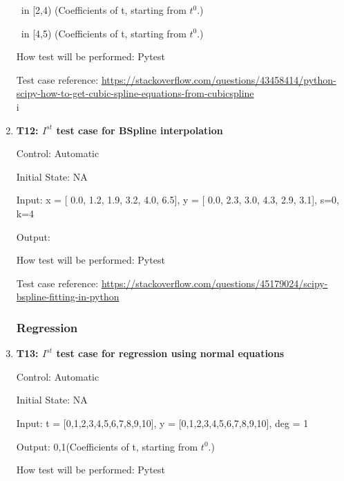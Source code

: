 \documentclass[12pt, titlepage]{article}
\begin{document}
\begin{enumerate}
~\newline [4.0, 4.0, 1.0, 1.0] in [2,4) (Coefficients of t, starting from $t^{0}$.)

~\newline[3.0, 3.61111111, 4.0, 4.0] in [4,5) (Coefficients of t, starting from $t^{0}$.)

How test will be performed: Pytest

Test case reference: \url{https://stackoverflow.com/questions/43458414/python-scipy-how-to-get-cubic-spline-equations-from-cubicspline}\\
i 

\item{\textbf{T12: $I^{st}$ test case for BSpline interpolation} \\}

Control: Automatic 

Initial State: NA

Input: x = [ 0.0, 1.2,  1.9,  3.2,  4.0,  6.5], y = [ 0.0,  2.3,  3.0,  4.3,  2.9,  3.1], s=0, k=4


Output: 
~\newline [-5.62048630e-18, 2.98780300e+00, -5.74472095e-01,  1.46700914e+01,
-1.03253068e+01,  3.10000000e+00,  0.00000000e+00,  0.00000000e+00,
0.00000000e+00,  0.00000000e+00,  0.00000000e+00]

How test will be performed: Pytest

Test case reference: \url{https://stackoverflow.com/questions/45179024/scipy-bspline-fitting-in-python}\\



\subsubsection{Regression}



\item{\textbf{T13: $I^{st}$ test case for regression using normal equations} \\}

Control: Automatic

Initial State: NA

Input: t = [0,1,2,3,4,5,6,7,8,9,10], y = [0,1,2,3,4,5,6,7,8,9,10], deg = 1 

Output: 0,1(Coefficients of t, starting from $t^{0}$.)

How test will be performed: Pytest\\


\end{enumerate}
\end{document}
